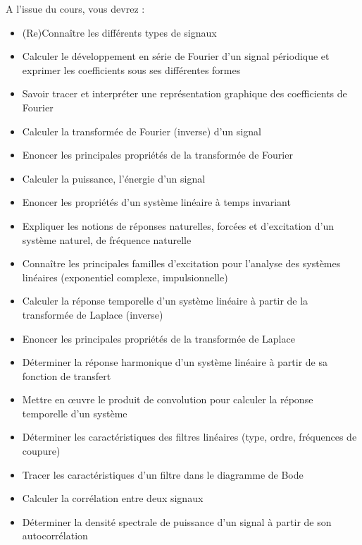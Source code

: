 	A l'issue du cours, vous devrez : 
	\begin{itemize}
		\item (Re)Connaître les différents types de signaux
		\item Calculer le développement en série de Fourier d'un signal périodique et exprimer les coefficients sous ses différentes formes 
		\item Savoir tracer et interpréter une représentation graphique des coefficients de Fourier
		\item Calculer la transformée de Fourier (inverse) d'un signal
		\item Enoncer les principales propriétés de la transformée de Fourier 
		\item Calculer la puissance, l'énergie d'un signal
		\item Enoncer les propriétés d'un système linéaire à temps invariant
		\item Expliquer les notions de réponses naturelles, forcées et d'excitation d'un système naturel, de fréquence naturelle
		\item Connaître les principales familles d'excitation pour l'analyse des systèmes linéaires (exponentiel complexe, impulsionnelle)
		\item Calculer la réponse temporelle d'un système linéaire à partir de la transformée de Laplace (inverse)
		\item Enoncer les principales propriétés de la transformée de Laplace
		\item Déterminer la réponse harmonique d'un système linéaire à partir de sa fonction de transfert
		\item Mettre en œuvre le produit de convolution pour calculer la réponse temporelle d'un système
		\item Déterminer les caractéristiques des filtres linéaires (type, ordre, fréquences de coupure)
		\item Tracer les caractéristiques d'un filtre dans le diagramme de Bode
		\item Calculer la corrélation entre deux signaux
		\item Déterminer la densité spectrale de puissance d'un signal à partir de son autocorrélation
	\end{itemize}
	
	
